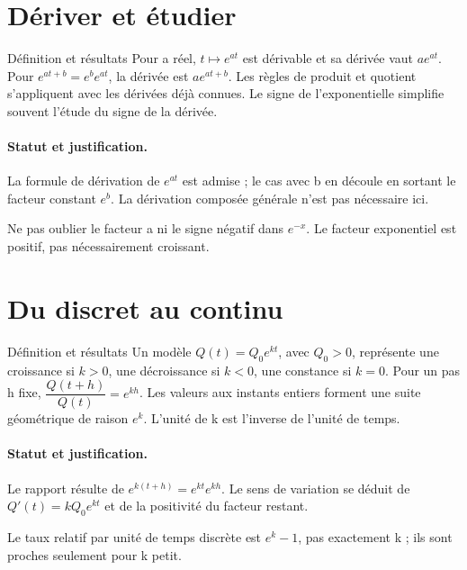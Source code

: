 \section{Dériver et étudier}\label{C09-U3}
\begin{repere}{Définition et résultats}
Pour a réel, $t\mapsto e^{at}$ est dérivable et sa dérivée vaut $ae^{at}$. Pour $e^{at+b}=e^be^{at}$, la dérivée est $ae^{at+b}$. Les règles de produit et quotient s’appliquent avec les dérivées déjà connues. Le signe de l’exponentielle simplifie souvent l’étude du signe de la dérivée.
\end{repere}
\paragraph{Statut et justification.} La formule de dérivation de $e^{at}$ est admise ; le cas avec b en découle en sortant le facteur constant $e^b$. La dérivation composée générale n’est pas nécessaire ici.
\label{C09-EX3}
\begin{erreur}Ne pas oublier le facteur a ni le signe négatif dans $e^{-x}$. Le facteur exponentiel est positif, pas nécessairement croissant.\end{erreur}
\label{C09-AP3}
\section{Du discret au continu}\label{C09-U4}
\begin{repere}{Définition et résultats}
Un modèle $Q(t)=Q_0e^{kt}$, avec $Q_0>0$, représente une croissance si $k>0$, une décroissance si $k<0$, une constance si $k=0$. Pour un pas h fixe, $\dfrac{Q(t+h)}{Q(t)}=e^{kh}$. Les valeurs aux instants entiers forment une suite géométrique de raison $e^k$. L’unité de k est l’inverse de l’unité de temps.
\end{repere}
\paragraph{Statut et justification.} Le rapport résulte de $e^{k(t+h)}=e^{kt}e^{kh}$. Le sens de variation se déduit de $Q\prime(t)=kQ_0e^{kt}$ et de la positivité du facteur restant.
\label{C09-EX4}

\begin{erreur}Le taux relatif par unité de temps discrète est $e^k-1$, pas exactement k ; ils sont proches seulement pour k petit.\end{erreur}
\label{C09-AP4}
